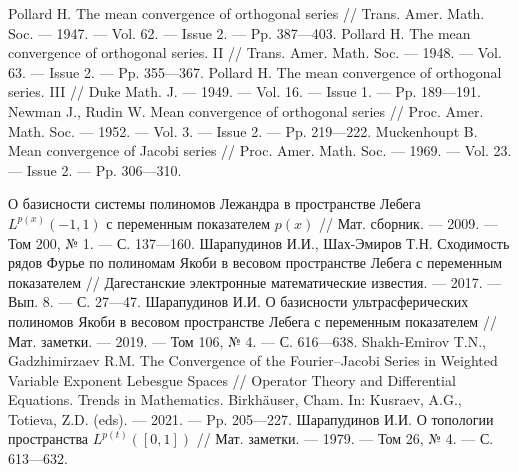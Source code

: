 \begin{thebibliography}{111}

  
 Pollard H. The mean convergence of orthogonal series // Trans. Amer. Math. Soc.
--- 1947. --- Vol. 62. --- Issue 2. --- Pp. 387---403.
 Pollard H. The mean convergence of orthogonal series. II // Trans. Amer. Math. Soc.
--- 1948. --- Vol. 63. --- Issue 2. --- Pp. 355---367.
 Pollard H. The mean convergence of orthogonal series. III // Duke Math. J. --- 1949.
--- Vol. 16. --- Issue 1. --- Pp. 189---191.
 Newman J., Rudin W. Mean convergence of orthogonal series // Proc. Amer. Math.
Soc. --- 1952. --- Vol. 3. --- Issue 2. --- Pp. 219---222.
Muckenhoupt B. Mean convergence of Jacobi series // Proc. Amer. Math. Soc. --- 1969.
--- Vol. 23. --- Issue 2. --- Pp. 306---310.

 О базисности системы полиномов Лежандра в пространстве Лебега $L^{p(x)}(-1,1)$ с переменным показателем $p(x)$ // Мат. сборник. --- 2009. --- Том 200, № 1. --- С. 137---160.
Шарапудинов И.И., Шах-Эмиров Т.Н. Сходимость рядов Фурье по полиномам Якоби в весовом пространстве Лебега с переменным показателем // Дагестанские электронные математические известия. --- 2017. --- Вып. 8. --- С. 27---47.
Шарапудинов И.И. О базисности ультрасферических полиномов Якоби в весовом пространстве Лебега с переменным показателем // Мат. заметки. --- 2019. --- Том 106, № 4. --- С. 616---638.
 Shakh-Emirov T.N., Gadzhimirzaev R.M.  The Convergence of the Fourier–Jacobi Series in Weighted Variable Exponent Lebesgue Spaces // Operator Theory and Differential Equations. Trends in Mathematics. Birkhäuser, Cham.  In: Kusraev, A.G., Totieva, Z.D. (eds). --- 2021. --- Pp. 205---227.
 Шарапудинов И.И. О топологии пространства $L^{p(t)}([0,1])$ // Мат. заметки. --- 1979. --- Том 26, № 4. --- С. 613---632.

 


\end{thebibliography}
